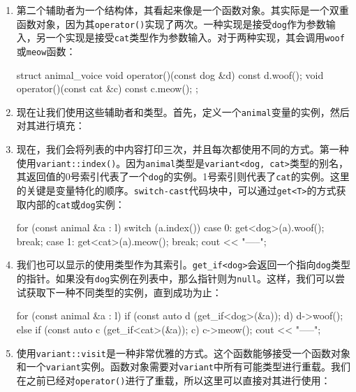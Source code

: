 \begin{enumerate}
\item 第二个辅助者为一个结构体，其看起来像是一个函数对象。其实际是一个双重函数对象，因为其\texttt{operator()}实现了两次。一种实现是接受\texttt{dog}作为参数输入，另一个实现是接受\texttt{cat}类型作为参数输入。对于两种实现，其会调用\texttt{woof}或\texttt{meow}函数：

\begin{codebox}[cpp]
struct animal_voice
{
    void operator()(const dog &d) const { d.woof(); }
    void operator()(const cat &c) const { c.meow(); }
};
\end{codebox}

\item 现在让我们使用这些辅助者和类型。首先，定义一个\texttt{animal}变量的实例，然后对其进行填充：

\begin{codebox}[cpp]
int main()
{
    list<animal> l {cat{"Tuba"}, dog{"Balou"}, cat{"Bobby"}};
\end{codebox}

\item 现在，我们会将列表的中内容打印三次，并且每次都使用不同的方式。第一种使用\texttt{variant::index()}。因为\texttt{animal}类型是\texttt{variant<dog, cat>}类型的别名，其返回值的0号索引代表了一个\texttt{dog}的实例。1号索引则代表了\texttt{cat}的实例。这里的关键是变量特化的顺序。\texttt{switch-cast}代码块中，可以通过\texttt{get<T>}的方式获取内部的\texttt{cat}或\texttt{dog}实例：

\begin{codebox}[cpp]
for (const animal &a : l) {
    switch (a.index()) {
    case 0:
        get<dog>(a).woof();
        break;
    case 1:
        get<cat>(a).meow();
        break;
    }
}
cout << "-----\n";
\end{codebox}

\item 我们也可以显示的使用类型作为其索引。\texttt{get\_if<dog>}会返回一个指向\texttt{dog}类型的指针。如果没有\texttt{dog}实例在列表中，那么指针则为\texttt{null}。这样，我们可以尝试获取下一种不同类型的实例，直到成功为止：

\begin{codebox}[cpp]
    for (const animal &a : l) {
        if (const auto d (get_if<dog>(&a)); d) {
            d->woof();
        } else if (const auto c (get_if<cat>(&a)); c) {
            c->meow();
        }
    }
    cout << "-----\n";
\end{codebox}

\item 使用\texttt{variant::visit}是一种非常优雅的方式。这个函数能够接受一个函数对象和一个\texttt{variant}实例。函数对象需要对\texttt{variant}中所有可能类型进行重载。我们在之前已经对\texttt{operator()}进行了重载，所以这里可以直接对其进行使用：


\end{enumerate}
